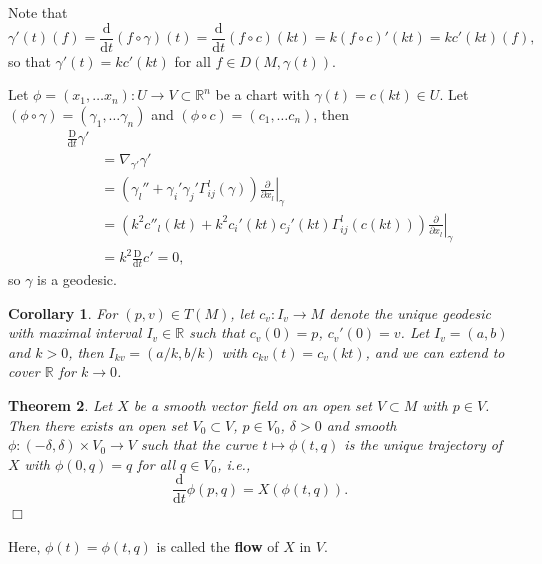 \documentclass[letter-paper]{tufte-book}
\newtheorem{theorem}{\color{pastel-blue}Theorem}[section]
\newtheorem{corollary}[theorem]{\color{pastel-blue}Corollary}
\newenvironment{proof}[1][Proof]{\begin{trivlist}
\item[\hskip \labelsep {\bfseries #1}]}{\end{trivlist}}
\newcommand{\qedwhite}{\hfill \ensuremath{\Box}}
\begin{document}
\begin{proof}
  Note that
  \begin{equation*}
    \gamma'(t)(f) = \frac{\mathrm{d}}{\mathrm{d}t} (f\circ \gamma)(t) = \frac{\mathrm{d}}{\mathrm{d}t} (f\circ c)(kt) = k(f\circ c)'(kt) = kc'(kt)(f),
  \end{equation*}
  so that $\gamma'(t) = kc'(kt)$ for all $f \in D(M, \gamma(t))$.
  
  Let $\phi = (x_1, \ldots x_n): U\to V\subset\mathbb{R}^n$ be a chart with $\gamma(t) = c(kt) \in U$. Let $(\phi\circ \gamma) = (\gamma_1, \ldots \gamma_n)$ and $(\phi\circ c) = (c_1, \ldots c_n)$, then
  \begin{align*}
    \frac{\mathrm{D}}{\mathrm{d}t} \gamma'\\
      &= \nabla_{\gamma'}\gamma' \\
      &= \left(\gamma_l'' + \gamma_i'\gamma_j' \Gamma_{ij}^l(\gamma)\right) \left.\frac{\partial}{\partial x_l}\right|_{\gamma}\\
      &=\left( k^2 c''_l(kt) + k^2 c_i'(kt)c_j'(kt) \Gamma_{ij}^l(c(kt)) \right) \left.\frac{\partial}{\partial x_l}\right|_{\gamma}\\
      &= k^2 \frac{\mathrm{D}}{\mathrm{d}t} c' = 0,
  \end{align*}
  so $\gamma$ is a geodesic.
\end{proof}

\begin{corollary}
  For $(p,v) \in T(M)$, let $c_v : I_v \to M$ denote the unique geodesic with maximal interval $I_v \in \mathbb{R}$ such that $c_v(0) = p$, $c_v'(0) = v$. Let $I_v = (a,b)$ and $k>0$, then $I_{kv} = (a/k, b/k)$ with $c_{kv}(t) = c_v(kt)$, and we can extend to cover $\mathbb{R}$ for $k\to 0$.
\end{corollary}

\begin{theorem}
  Let $X$ be a smooth vector field on an open set $V \subset M$ with $p\in V$. Then there exists an open set $V_0 \subset V$, $p\in V_0$, $\delta > 0$ and smooth $\phi: (-\delta, \delta) \times V_0 \to V$ such that the curve $t\mapsto \phi(t,q)$ is the unique trajectory of $X$ with $\phi(0,q) = q$ for all $q\in V_0$, i.e.,
  \begin{equation*}
    \frac{\mathrm{d}}{\mathrm{d}t}\phi(p, q) = X(\phi(t,q)).
  \end{equation*}
  \qedwhite
\end{theorem}

Here, $\phi(t) = \phi(t, q)$ is called the \textbf{flow} of $X$ in $V$.
\end{document}
